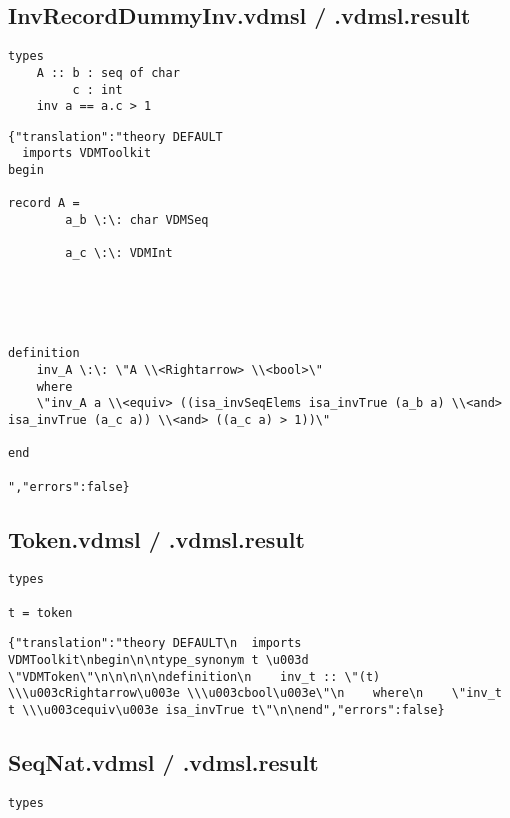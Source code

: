 \begin{appendices}
\subsection{InvRecordDummyInv.vdmsl / .vdmsl.result}
\begin{lstlisting}
types
    A :: b : seq of char
         c : int
    inv a == a.c > 1
\end{lstlisting}

\begin{lstlisting}
{"translation":"theory DEFAULT
  imports VDMToolkit
begin

record A =
        a_b \:\: char VDMSeq

        a_c \:\: VDMInt

    



definition
    inv_A \:\: \"A \\<Rightarrow> \\<bool>\"
    where
    \"inv_A a \\<equiv> ((isa_invSeqElems isa_invTrue (a_b a) \\<and> isa_invTrue (a_c a)) \\<and> ((a_c a) > 1))\"

end

","errors":false}
\end{lstlisting}

\subsection{Token.vdmsl / .vdmsl.result}
\begin{lstlisting}
types

t = token
\end{lstlisting}

\begin{lstlisting}
{"translation":"theory DEFAULT\n  imports VDMToolkit\nbegin\n\ntype_synonym t \u003d \"VDMToken\"\n\n\n\n\ndefinition\n    inv_t :: \"(t) \\\u003cRightarrow\u003e \\\u003cbool\u003e\"\n    where\n    \"inv_t t \\\u003cequiv\u003e isa_invTrue t\"\n\nend","errors":false}
\end{lstlisting}

\subsection{SeqNat.vdmsl / .vdmsl.result}
\begin{lstlisting}
types


\end{lstlisting}
\end{appendices}
